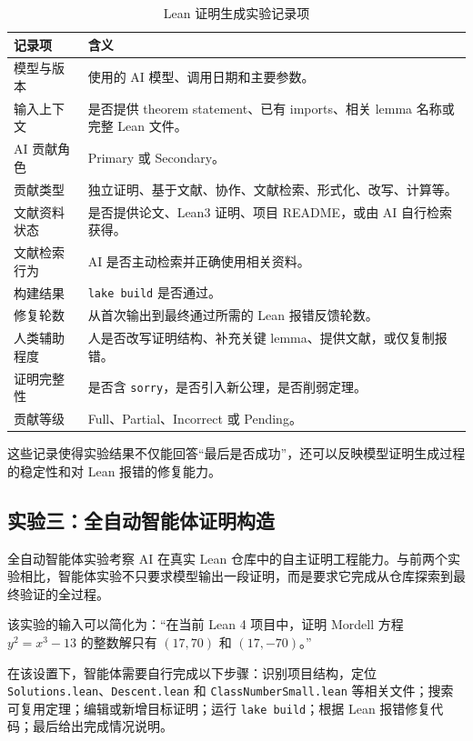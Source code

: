 \begin{table}[H]
\centering
\small
\caption{Lean 证明生成实验记录项}
\label{tab:lean-proof-record-fields}
\begin{tabular}{@{}p{}p{}@{}}
\toprule
\textbf{记录项} & \textbf{含义} \\
\midrule
模型与版本 & 使用的 AI 模型、调用日期和主要参数。 \\
输入上下文 & 是否提供 theorem statement、已有 imports、相关 lemma 名称或完整 Lean 文件。 \\
AI 贡献角色 & Primary 或 Secondary。 \\
贡献类型 & 独立证明、基于文献、协作、文献检索、形式化、改写、计算等。 \\
文献资料状态 & 是否提供论文、Lean3 证明、项目 README，或由 AI 自行检索获得。 \\
文献检索行为 & AI 是否主动检索并正确使用相关资料。 \\
构建结果 & \texttt{lake build} 是否通过。 \\
修复轮数 & 从首次输出到最终通过所需的 Lean 报错反馈轮数。 \\
人类辅助程度 & 人是否改写证明结构、补充关键 lemma、提供文献，或仅复制报错。 \\
证明完整性 & 是否含 \texttt{sorry}，是否引入新公理，是否削弱定理。 \\
贡献等级 & Full、Partial、Incorrect 或 Pending。 \\
\bottomrule
\end{tabular}
\end{table}

这些记录使得实验结果不仅能回答“最后是否成功”，还可以反映模型证明生成过程的稳定性和对 Lean 报错的修复能力。

\subsection{实验三：全自动智能体证明构造}

全自动智能体实验考察 AI 在真实 Lean 仓库中的自主证明工程能力。与前两个实验相比，智能体实验不只要求模型输出一段证明，而是要求它完成从仓库探索到最终验证的全过程。

该实验的输入可以简化为：“在当前 Lean 4 项目中，证明 Mordell 方程 \(y^2=x^3-13\) 的整数解只有 \((17,70)\) 和 \((17,-70)\)。”

在该设置下，智能体需要自行完成以下步骤：识别项目结构，定位 \texttt{Solutions.lean}、\texttt{Descent.lean} 和 \texttt{ClassNumberSmall.lean} 等相关文件；搜索可复用定理；编辑或新增目标证明；运行 \texttt{lake build}；根据 Lean 报错修复代码；最后给出完成情况说明。

